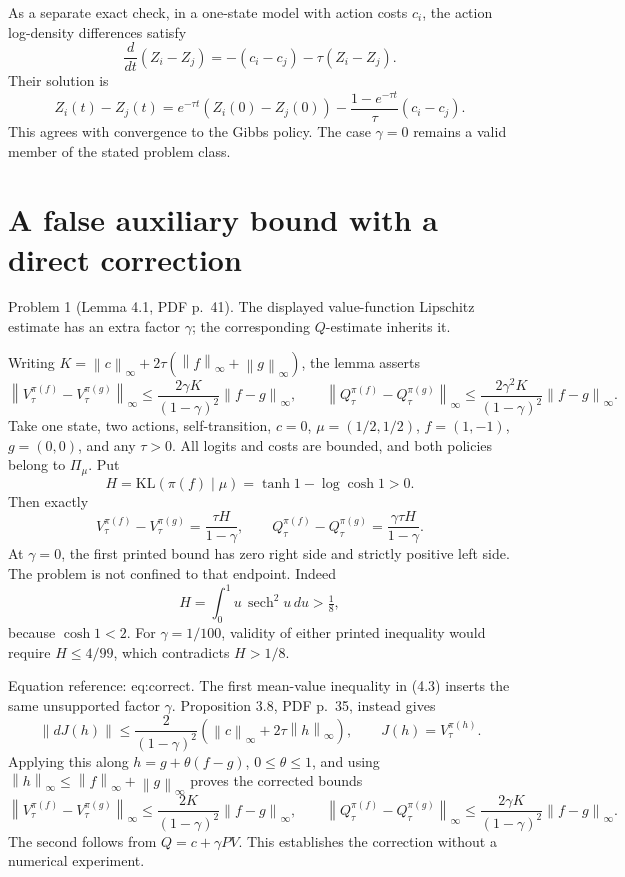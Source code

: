\documentclass[10pt]{article}
\begin{document}
As a separate exact check, in a one-state model with action costs \(c_i\), the action log-density differences satisfy \[\frac{d}{dt}(Z_i-Z_j)=-(c_i-c_j)-\tau(Z_i-Z_j).\] Their solution is \[Z_i(t)-Z_j(t)=e^{-\tau t}(Z_i(0)-Z_j(0))
              -\frac{1-e^{-\tau t}}{\tau}(c_i-c_j).\] This agrees with convergence to the Gibbs policy. The case \(\gamma=0\) remains a valid member of the stated problem class.\par
\section*{A false auxiliary bound with a direct correction}
Problem 1 (Lemma 4.1, PDF p. 41).  The displayed value-function Lipschitz estimate has an extra factor \(\gamma\); the corresponding \(Q\)-estimate inherits it.\par
Writing \(K=\left\lVert c\right\rVert_\infty+2\tau(\left\lVert f\right\rVert_\infty+\left\lVert g\right\rVert_\infty)\), the lemma asserts \[\left\lVert V_\tau^{\pi(f)}-V_\tau^{\pi(g)}\right\rVert_\infty
 \le\frac{2\gamma K}{(1-\gamma)^2}\left\lVert f-g\right\rVert_\infty,
 \qquad
 \left\lVert Q_\tau^{\pi(f)}-Q_\tau^{\pi(g)}\right\rVert_\infty
 \le\frac{2\gamma^2 K}{(1-\gamma)^2}\left\lVert f-g\right\rVert_\infty.\] Take one state, two actions, self-transition, \(c=0\), \(\mu=(1/2,1/2)\), \(f=(1,-1)\), \(g=(0,0)\), and any \(\tau>0\). All logits and costs are bounded, and both policies belong to \(\Pi_\mu\). Put \[H=\mathrm{KL}(\pi(f)\mid\mu)=\tanh1-\log\cosh1>0.\] Then exactly \[V_\tau^{\pi(f)}-V_\tau^{\pi(g)}=\frac{\tau H}{1-\gamma},
 \qquad
 Q_\tau^{\pi(f)}-Q_\tau^{\pi(g)}=\frac{\gamma\tau H}{1-\gamma}.\] At \(\gamma=0\), the first printed bound has zero right side and strictly positive left side. The problem is not confined to that endpoint. Indeed \[H=\int_0^1 u\,\operatorname{sech}^2u\,du>\tfrac18,\] because \(\cosh1<2\). For \(\gamma=1/100\), validity of either printed inequality would require \(H\le4/99\), which contradicts \(H>1/8\).\par
Equation reference: eq:correct. The first mean-value inequality in (4.3) inserts the same unsupported factor \(\gamma\). Proposition 3.8, PDF p. 35, instead gives \[\left\lVert dJ(h)\right\rVert\le
 \frac2{(1-\gamma)^2}(\left\lVert c\right\rVert_\infty+2\tau\left\lVert h\right\rVert_\infty),
 \qquad J(h)=V_\tau^{\pi(h)}.\] Applying this along \(h=g+\theta(f-g)\), \(0\le\theta\le1\), and using \(\left\lVert h\right\rVert_\infty\le\left\lVert f\right\rVert_\infty+\left\lVert g\right\rVert_\infty\) proves the corrected bounds \[
 \left\lVert V_\tau^{\pi(f)}-V_\tau^{\pi(g)}\right\rVert_\infty
 \le\frac{2K}{(1-\gamma)^2}\left\lVert f-g\right\rVert_\infty,\qquad
 \left\lVert Q_\tau^{\pi(f)}-Q_\tau^{\pi(g)}\right\rVert_\infty
 \le\frac{2\gamma K}{(1-\gamma)^2}\left\lVert f-g\right\rVert_\infty.\] The second follows from \(Q=c+\gamma PV\). This establishes the correction without a numerical experiment.\par
\end{document}
